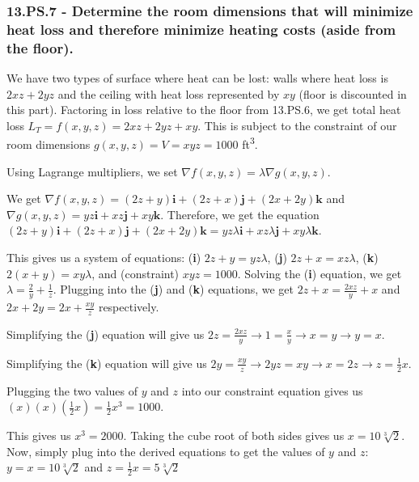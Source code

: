 \documentclass{article}
\begin{document}
\subsubsection{13.PS.7 - Determine the room dimensions that will minimize heat loss and therefore minimize heating costs (aside from the floor).}

\par\noindent\large We have two types of surface where heat can be lost: walls where heat loss is $2xz + 2yz$ and the ceiling with heat loss represented by $xy$ (floor is discounted in this part).  Factoring in loss relative to the floor from 13.PS.6, we get total heat loss $L_{T} = f(x, y, z) = 2xz + 2yz + xy$.  This is subject to the constraint of our room dimensions $g(x, y, z) = V = xyz = 1000$ ft\textsuperscript{3}.\vspace{0.25cm}

\par\noindent\large Using Lagrange multipliers, we set $\nabla f(x, y, z) = \lambda\nabla g(x, y, z)$.
\par\noindent\large We get $\nabla f(x, y, z) = (2z + y)\textbf{i} + (2z + x)\textbf{j} + (2x + 2y)\textbf{k}$ and $\nabla g(x, y, z) = yz\textbf{i} + xz\textbf{j} + xy\textbf{k}$.  Therefore, we get the equation $(2z + y)\textbf{i} + (2z + x)\textbf{j} + (2x + 2y)\textbf{k} = yz\lambda\textbf{i} + xz\lambda\textbf{j} + xy\lambda\textbf{k}$.\vspace{0.25cm}

\par\noindent\large This gives us a system of equations: (\textbf{i}) $2z + y = yz\lambda$, (\textbf{j}) $2z + x = xz\lambda$, (\textbf{k}) $2(x + y) = xy\lambda$, and (constraint) $xyz = 1000$. Solving the (\textbf{i}) equation, we get $\lambda = \frac{2}{y} + \frac{1}{z}$.  Plugging into the (\textbf{j}) and (\textbf{k}) equations, we get $2z + x = \frac{2xz}{y} + x$ and $2x + 2y = 2x + \frac{xy}{z}$ respectively.\vspace{0.25cm}

\par\noindent\large Simplifying the (\textbf{j}) equation will give us $2z = \frac{2xz}{y} \rightarrow 1 = \frac{x}{y} \rightarrow x = y \rightarrow y = x$.
\par\noindent\large Simplifying the (\textbf{k}) equation will give us $2y = \frac{xy}{z} \rightarrow 2yz = xy \rightarrow x = 2z \rightarrow z = \frac{1}{2}x$.
\par\noindent\large Plugging the two values of $y$ and $z$ into our constraint equation gives us $(x)(x)(\frac{1}{2}x) = \frac{1}{2}x^{3} = 1000$.
\par\noindent\large This gives us $x^{3} = 2000$.  Taking the cube root of both sides gives us $x = 10\sqrt[3]{2}$.  Now, simply plug into the derived equations to get the values of $y$ and $z$: $y = x = 10\sqrt[3]{2}$ and $z = \frac{1}{2}x = 5\sqrt[3]{2}$
\end{document}
